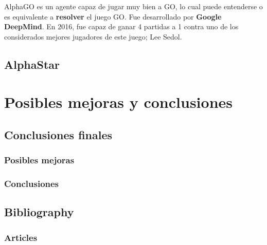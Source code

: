 \documentclass[11pt,fleqn]{book} %
\begin{document}
AlphaGO es un agente capaz de jugar muy bien a GO, lo cual puede entenderse o es equivalente a \textbf{resolver} el juego GO. Fue desarrollado por \textbf{Google DeepMind}. En 2016, fue capaz de ganar 4 partidas a 1 contra uno de los considerados mejores jugadores de este juego; Lee Sedol.

\chapter{AlphaStar}


\part{Posibles mejoras y conclusiones}

\chapter{Conclusiones finales}

\section{Posibles mejoras}

\section{Conclusiones}


\chapter*{Bibliography}


\section*{Articles}
\printbibliography[heading=bibempty,type=article]
\end{document}
